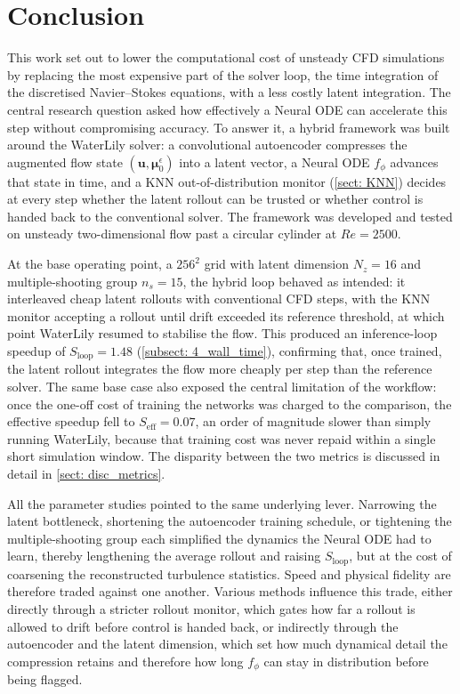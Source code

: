 \chapter{Conclusion}
\label{chap: conclusion}

This work set out to lower the computational cost of unsteady CFD simulations by replacing the most expensive part of the solver loop, the time integration of the discretised Navier--Stokes equations, with a less costly latent integration. The central research question asked how effectively a Neural ODE can accelerate this step without compromising accuracy. To answer it, a hybrid framework was built around the WaterLily solver: a convolutional autoencoder compresses the augmented flow state $(\mathbf{u}, \boldsymbol{\mu}_0^\epsilon)$ into a latent vector, a Neural ODE $f_\phi$ advances that state in time, and a KNN out-of-distribution monitor (\autoref{sect: KNN}) decides at every step whether the latent rollout can be trusted or whether control is handed back to the conventional solver. The framework was developed and tested on unsteady two-dimensional flow past a circular cylinder at $Re=2500$.

At the base operating point, a $256^2$ grid with latent dimension $N_z=16$ and multiple-shooting group $n_s=15$, the hybrid loop behaved as intended: it interleaved cheap latent rollouts with conventional CFD steps, with the KNN monitor accepting a rollout until drift exceeded its reference threshold, at which point WaterLily resumed to stabilise the flow. This produced an inference-loop speedup of $S_\text{loop}=1.48$ (\autoref{subsect: 4_wall_time}), confirming that, once trained, the latent rollout integrates the flow more cheaply per step than the reference solver. The same base case also exposed the central limitation of the workflow: once the one-off cost of training the networks was charged to the comparison, the effective speedup fell to $S_\text{eff}=0.07$, an order of magnitude slower than simply running WaterLily, because that training cost was never repaid within a single short simulation window. The disparity between the two metrics is discussed in detail in \autoref{sect: disc_metrics}.

All the parameter studies pointed to the same underlying lever. Narrowing the latent bottleneck, shortening the autoencoder training schedule, or tightening the multiple-shooting group each simplified the dynamics the Neural ODE had to learn, thereby lengthening the average rollout and raising $S_\text{loop}$, but at the cost of coarsening the reconstructed turbulence statistics. Speed and physical fidelity are therefore traded against one another. Various methods influence this trade, either directly through a stricter rollout monitor, which gates how far a rollout is allowed to drift before control is handed back, or indirectly through the autoencoder and the latent dimension, which set how much dynamical detail the compression retains and therefore how long $f_\phi$ can stay in distribution before being flagged. 


